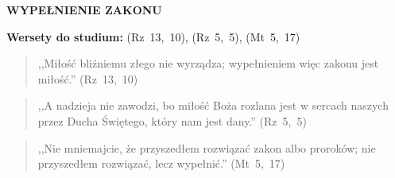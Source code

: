 \documentclass[10pt,a4paper,oneside]{article}
\begin{document}
\centerline{\textbf{\MakeUppercase{Wypełnienie zakonu}}}
\begin{center}
\textbf{Wersety do studium:} (Rz~13,~10), (Rz~5,~5), (Mt~5,~17)
\end{center}
\begin{quote}
,,Miłość bliźniemu złego nie wyrządza; wypełnieniem więc zakonu jest miłość.'' (Rz~13,~10)
\end{quote}
\begin{quote}
,,A nadzieja nie zawodzi, bo miłość Boża rozlana jest w sercach naszych przez Ducha Świętego, który nam jest dany.'' (Rz~5,~5)
\end{quote}
\begin{quote}
,,Nie mniemajcie, że przyszedłem rozwiązać zakon albo proroków; nie przyszedłem rozwiązać, lecz wypełnić.'' (Mt~5,~17)
\end{quote}
\end{document}
